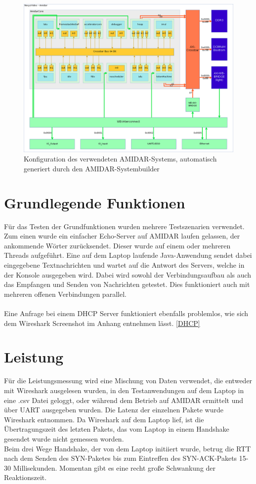 \begin{figure}
	\centering
	\includegraphics[width = 1\textwidth]{Graphics/system.png}
	\caption{Konfiguration des verwendeten AMIDAR-Systems, automatisch generiert durch den AMIDAR-Systembuilder}

\end{figure}

\FloatBarrier
\section{Grundlegende Funktionen}

Für das Testen der Grundfunktionen wurden mehrere Testszenarien verwendet. Zum einen wurde ein einfacher Echo-Server auf AMIDAR laufen gelassen, der ankommende Wörter zurücksendet. Dieser wurde auf einem oder mehreren Threads aufgeführt. Eine auf dem Laptop laufende Java-Anwendung sendet dabei eingegebene Textnachrichten und wartet auf die Antwort des Servers, welche in der Konsole ausgegeben wird. Dabei wird sowohl der Verbindungsaufbau als auch das Empfangen und Senden von Nachrichten getestet. Dies funktioniert auch mit mehreren offenen Verbindungen parallel. \\\\
Eine Anfrage bei einem DHCP Server funktioniert ebenfalls problemlos, wie sich dem Wireshark Screenshot im Anhang entnehmen lässt. \autoref{DHCP}




\section{Leistung}
Für die Leistungsmessung wird eine Mischung von Daten verwendet, die entweder mit Wireshark ausgelesen wurden, in den Testanwendungen auf dem Laptop in eine .csv Datei geloggt, oder während dem Betrieb auf AMIDAR ermittelt und über UART ausgegeben wurden. 
Die Latenz der einzelnen Pakete wurde Wireshark entnommen. Da Wireshark auf dem Laptop lief, ist die Übertragungszeit des letzten Pakets, das vom Laptop in einem Handshake gesendet wurde nicht gemessen worden. \\
Beim drei Wege Handshake, der von dem Laptop initiiert wurde, betrug die RTT nach dem Senden des SYN-Paketes bis zum Eintreffen des SYN-ACK-Pakets 15-30 Millisekunden. Momentan gibt es eine recht große Schwankung der Reaktionszeit. 

